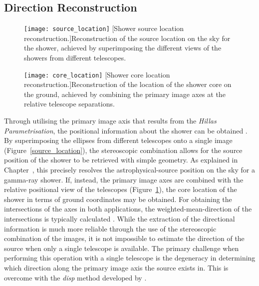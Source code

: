 \subsection{Direction Reconstruction}

\begin{figure}
\begin{minipage}[t]{.49\textwidth}
  \centering
  \texttt{[image: source\_location]} 
  [Shower source location reconstruction.]{Reconstruction of the source location on the sky for the shower, achieved by superimposing the different views of the showers from different telescopes.}
  \label{fig:source_location}
\end{minipage}%
\hfill
\begin{minipage}[t]{.49\textwidth}
  \centering
  \texttt{[image: core\_location]}
  [Shower core location reconstruction.]{Reconstruction of the location of the shower core on the ground, achieved by combining the primary image axes at the relative telescope separations.}
  \label{fig:core_location}
\end{minipage}
\end{figure}

Through utilising the primary image axis that results from the \textit{Hillas Parametrisation}, the positional information about the shower can be obtained \cite{Daum1997,Cogan2006,Dickinson2010}. By superimposing the ellipses from different telescopes onto a single image (Figure~\ref{source_location}), the stereoscopic combination allows for the source position of the shower to be retrieved with simple geometry. As explained in Chapter~, this precisely  resolves the astrophysical-source position on the sky  for a gamma-ray shower. If, instead, the primary image axes are combined with the relative positional view of the telescopes (Figure~\ref{fig:core_location}), the core location of the shower in terms of ground coordinates may be obtained. For obtaining the intersections of the axes in both applications, the weighted-mean-direction of the intersections is typically calculated \cite{Eschbach2016,Bernlohr2013a}. While the extraction of the directional information is much more reliable through the use of the stereoscopic combination of the images, it is not impossible to estimate the direction of the source when only a single telescope is available. The primary challenge when performing this operation with a single telescope is the degeneracy in determining which direction along the primary image axis the source exists in. This is overcome with the \textit{disp} method developed by \textcite{Lessard2001}.

